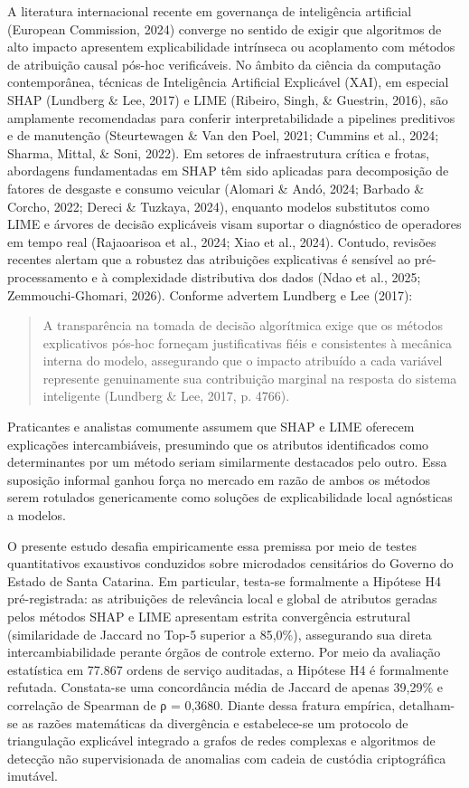\documentclass[10pt,a4paper,journal]{article}
\begin{document}
A literatura internacional recente em governança de inteligência artificial (European Commission, 2024) converge no sentido de exigir que algoritmos de alto impacto apresentem explicabilidade intrínseca ou acoplamento com métodos de atribuição causal pós-hoc verificáveis. No âmbito da ciência da computação contemporânea, técnicas de Inteligência Artificial Explicável (XAI), em especial SHAP (Lundberg \& Lee, 2017) e LIME (Ribeiro, Singh, \& Guestrin, 2016), são amplamente recomendadas para conferir interpretabilidade a pipelines preditivos e de manutenção (Steurtewagen \& Van den Poel, 2021; Cummins et al., 2024; Sharma, Mittal, \& Soni, 2022). Em setores de infraestrutura crítica e frotas, abordagens fundamentadas em SHAP têm sido aplicadas para decomposição de fatores de desgaste e consumo veicular (Alomari \& Andó, 2024; Barbado \& Corcho, 2022; Dereci \& Tuzkaya, 2024), enquanto modelos substitutos como LIME e árvores de decisão explicáveis visam suportar o diagnóstico de operadores em tempo real (Rajaoarisoa et al., 2024; Xiao et al., 2024). Contudo, revisões recentes alertam que a robustez das atribuições explicativas é sensível ao pré-processamento e à complexidade distributiva dos dados (Ndao et al., 2025; Zemmouchi-Ghomari, 2026). Conforme advertem Lundberg e Lee (2017):

\begin{quote}
\small A transparência na tomada de decisão algorítmica exige que os métodos explicativos pós-hoc forneçam justificativas fiéis e consistentes à mecânica interna do modelo, assegurando que o impacto atribuído a cada variável represente genuinamente sua contribuição marginal na resposta do sistema inteligente (Lundberg \& Lee, 2017, p. 4766).
\end{quote}
Praticantes e analistas comumente assumem que SHAP e LIME oferecem explicações intercambiáveis, presumindo que os atributos identificados como determinantes por um método seriam similarmente destacados pelo outro. Essa suposição informal ganhou força no mercado em razão de ambos os métodos serem rotulados genericamente como soluções de explicabilidade local agnósticas a modelos.

O presente estudo desafia empiricamente essa premissa por meio de testes quantitativos exaustivos conduzidos sobre microdados censitários do Governo do Estado de Santa Catarina. Em particular, testa-se formalmente a Hipótese H4 pré-registrada: as atribuições de relevância local e global de atributos geradas pelos métodos SHAP e LIME apresentam estrita convergência estrutural (similaridade de Jaccard no Top-5 superior a 85,0\%), assegurando sua direta intercambiabilidade perante órgãos de controle externo. Por meio da avaliação estatística em 77.867 ordens de serviço auditadas, a Hipótese H4 é formalmente refutada. Constata-se uma concordância média de Jaccard de apenas 39,29\% e correlação de Spearman de ρ = 0,3680. Diante dessa fratura empírica, detalham-se as razões matemáticas da divergência e estabelece-se um protocolo de triangulação explicável integrado a grafos de redes complexas e algoritmos de detecção não supervisionada de anomalias com cadeia de custódia criptográfica imutável.
\end{document}
